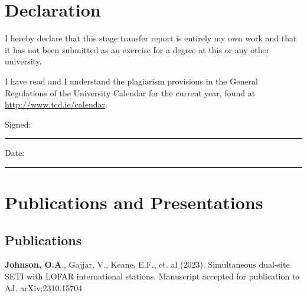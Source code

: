 \documentclass[a4paper,12pt]{article}
\numberwithin{equation}{section}
\begin{document}
\newpage
\setcounter{page}{1}                            %
\footruleheight{1pt}
\headruleheight{1pt}
\rhead{ \thepage}
\cfoot{}
%
{
\hypersetup{linkcolor=black}
\tableofcontents 
} 
\thispagestyle{empty}         
\newpage 

\section*{Declaration}
I hereby declare that this stage transfer report is entirely my own work and that it has not been submitted as an exercise for a degree at this or any other university.

I have read and I understand the plagiarism provisions in the General Regulations of the University Calendar for the current year, found at \url{http://www.tcd.ie/calendar}.

\vspace{1cm}

Signed:~\rule{5cm}{0.3pt}\hfill Date:~\rule{5cm}{0.3pt}

\vspace*{\fill}
\newpage

\section*{Publications and Presentations}
\subsection*{Publications}

\textbf{Johnson, O.A}., Gajjar, V., Keane, E.F., et. al (2023). Simultaneous dual-site SETI with LOFAR international stations. Manuscript accepted for publication to AJ. arXiv:2310.15704
\end{document}

